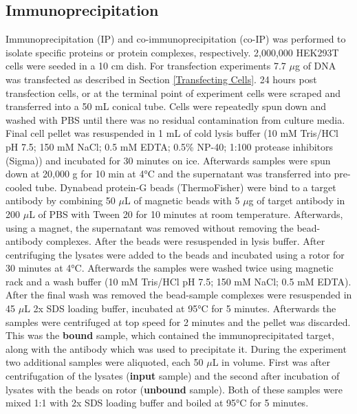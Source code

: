 \subsection{Immunoprecipitation} \label{Immunoprecipitation}
Immunoprecipitation (IP) and co-immunoprecipitation (co-IP) was performed to isolate specific proteins or protein complexes, respectively. 2,000,000 HEK293T cells were seeded in a 10 cm dish. For transfection experiments 7.7 \(\mu\)g of DNA was transfected as described in Section \ref{Transfecting Cells}. 24 hours post transfection cells, or at the terminal point of experiment cells were scraped and transferred into a 50 mL conical tube. Cells were repeatedly spun down and washed with PBS until there was no residual contamination from culture media. Final cell pellet was resuspended in 1 mL of cold lysis buffer (10 mM Tris/HCl pH 7.5; 150 mM NaCl; 0.5 mM EDTA; 0.5\% NP-40; 1:100 protease inhibitors (Sigma)) and incubated for 30 minutes on ice. Afterwards samples were spun down at 20,000 g for 10 min at 4°C and the supernatant was transferred into pre-cooled tube. Dynabead protein-G beads (ThermoFisher) were bind to a target antibody by combining 50 \(\mu\)L of magnetic beads with 5 \(\mu\)g of target antibody in 200 \(\mu\)L of PBS with Tween 20 for 10 minutes at room temperature. Afterwards, using a magnet, the supernatant was removed without removing the bead-antibody complexes. After the beads were resuspended in lysis buffer. After centrifuging the lysates were added to the beads and incubated using a rotor for 30 minutes at 4°C. Afterwards the samples were washed twice using magnetic rack and a wash buffer (10 mM Tris/HCl pH 7.5; 150 mM NaCl; 0.5 mM EDTA). After the final wash was removed the bead-sample complexes were resuspended in 45 \(\mu\)L 2x SDS loading buffer, incubated at 95°C for 5 minutes. Afterwards the samples were centrifuged at top speed for 2 minutes and the pellet was discarded. This was the \textbf{bound} sample, which contained the immunoprecipitated target, along with the antibody which was used to precipitate it. During the experiment two additional samples were aliquoted, each 50 \(\mu\)L in volume. First was after centrifugation of the lysates (\textbf{input} sample) and the second after incubation of lysates with the beads on rotor (\textbf{unbound} sample). Both of these samples were mixed 1:1 with 2x SDS loading buffer and boiled at 95°C for 5 minutes.




